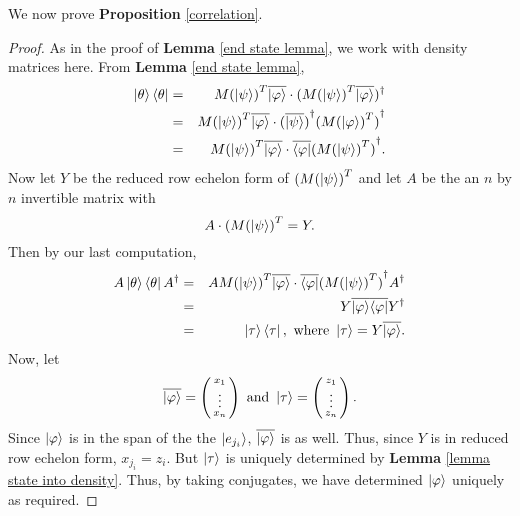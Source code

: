 We now prove {\bf{Proposition}} \ref{correlation}.
\begin{proof}
As in the proof of {\bf{Lemma}} \ref{end state lemma}, we work with density matrices here.  From {\bf{Lemma}} \ref{end state lemma},
\begin{eqnarray}
\ket{\theta}\bra{\theta}&=&{M(\ket{\psi})}^T\overline{\ket{\varphi}}\cdot({M(\ket{\psi})}^T\overline{\ket{\varphi}})^\dagger\\
&=&{M(\ket{\psi})}^T\overline{\ket{\varphi}}\cdot {(\overline{\ket{\psi}})}^\dagger {({M(\ket{\varphi})}^T)}^\dagger \\
&=&{M(\ket{\psi})}^T\overline{\ket{\varphi}}\cdot \overline{\bra{\varphi}} {({M(\ket{\psi})}^T)}^\dagger.
\end{eqnarray}
Now let $Y$ be the reduced row echelon form of $({M(\ket{\psi})}^T$ and let $A$ be the an $n$ by $n$ invertible matrix with
\begin{equation}
A \cdot ({M(\ket{\psi})}^T=Y.
\end{equation}
Then by our last computation,
\begin{eqnarray}
A\ket{\theta}\bra{\theta}A^\dagger&=&A {M(\ket{\psi})}^T\overline{\ket{\varphi}}\cdot \overline{\bra{\varphi}} {({M(\ket{\psi})}^T)}^\dagger A^\dagger\\
&=&Y \overline{\ket{\varphi}} \overline{\bra{\varphi}} Y^\dagger\\
&=& \ket{\tau}\bra{\tau},\textrm{ where }\ket{\tau}=Y\overline{\ket{\varphi}}.
\end{eqnarray}
Now, let 
\begin{equation}
\overline{\ket{\varphi}}=\left(\begin{smallmatrix}x_1 \\ \vdots \\ x_n\end{smallmatrix}\right) \textrm{ and }\ket{\tau}=\left(\begin{smallmatrix}z_1\\ \vdots \\ z_n\end{smallmatrix}\right).
\end{equation}
Since $\ket{\varphi}$ is in the span of the the $\ket{e_{j_i}}$, $\overline{\ket{\varphi}}$ is as well.  Thus, since $Y$ is in reduced row echelon form, $x_{j_i}=z_i$.  But $\ket{\tau}$ is uniquely determined by {\bf{Lemma}} \ref{lemma state into density}.  Thus, by taking conjugates, we have determined $\ket{\varphi}$ uniquely as required.


\end{proof} 

